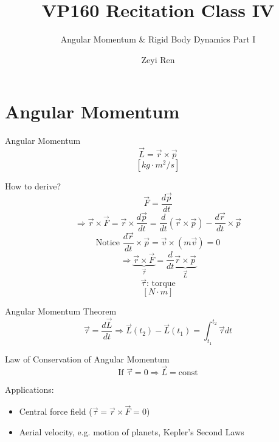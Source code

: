 \documentclass{beamer}
\title{VP160 Recitation Class IV}
\subtitle{Angular Momentum \& Rigid Body Dynamics Part I}
\author{Zeyi Ren}
\institute{UM-SJTU Joint Institute}
\begin{document}
\maketitle

\frame{\tableofcontents}

\section{Angular Momentum}
\begin{frame}
  \begin{block}{Angular Momentum}
    $$\vec{L} = \vec{r}\times \vec{p}$$
    $$[kg\cdot m^2/s]$$
  \end{block}
  \pause
How to derive?
$$\vec{F} = \frac{d\vec{p}}{dt}$$\pause
$$\Rightarrow \vec{r}\times \vec{F} = \vec{r}\times \frac{d\vec{p}}{dt} = \frac{d}{dt}(\vec{r}\times \vec{p}) - \frac{d\vec{r}}{dt}\times \vec{p}$$\pause
$$
\text{Notice }\frac{d\vec{r}}{dt}\times \vec{p}=\vec{v}\times (m\vec{v}) = 0 
$$\pause
$$\Rightarrow \underbrace{\vec{r}\times \vec{F}}_{\vec{\tau}} = \frac{d}{dt}\underbrace{\vec{r}\times \vec{p}}_{\vec{L}}$$
$$\vec{\tau}\text{: torque}$$
$$[N\cdot m]$$
\end{frame}

\begin{frame}
  \begin{block}{Angular Momentum Theorem}
    $$\vec{\tau} = \frac{d\vec{L}}{dt}\Rightarrow \vec{L}(t_2) - \vec{L}(t_1) = \int_{t_1}^{t_2}\vec{\tau}dt$$
  \end{block}\pause
  \begin{block}{Law of Conservation of Angular Momentum}
    $$\text{If }\vec{\tau} = 0\Rightarrow \vec{L} = \text{const}$$
  \end{block}\pause
  Applications: 
  \begin{itemize}
    \item Central force field ($\vec{\tau} = \vec{r}\times \vec{F} = 0$)\pause
    \item Aerial velocity, e.g. motion of planets, Kepler's Second Laws 
  \end{itemize}
\end{frame}
\end{document}
